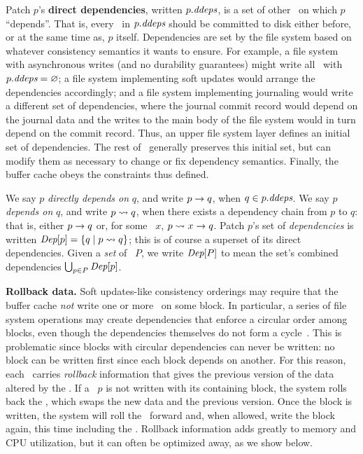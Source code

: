 Patch $p$'s \textbf{direct dependencies}, written $\PDDepset{p}$, is a set of
 other \patches\ on which $p$ ``depends''.
%
That is, every \patch\ in $\PDDepset{p}$ should be committed to disk either
 before, or at the same time as, $p$ itself.
%
Dependencies are set by the file system based on whatever consistency
 semantics it wants to ensure.
%
For example, a file system with asynchronous writes (and no durability
 guarantees) might write all \patches\ with $\PDDepset{p} = \emptyset$;
%
a file system implementing soft updates would arrange the dependencies
 accordingly;
%
and a file system implementing journaling would write a different set of
 dependencies, where the journal commit record would depend on the journal
 data and the writes to the main body of the file system would in turn
 depend on the commit record.
%
Thus, an upper file system layer defines an initial set of
 dependencies.
%
The rest of \Kudos\ generally preserves this initial set, but can modify
 them as necessary to change or fix dependency semantics.
%
Finally, the buffer cache obeys the constraints thus defined.


We say $p$ \emph{directly depends on} $q$, and write $p \rightarrow q$, when
 $q \in \PDDepset{p}$.
%
We say $p$ \emph{depends on} $q$, and write $p \leadsto q$, when there
 exists a dependency chain from $p$ to $q$: that is, either $p \rightarrow q$
 or, for some \patch\ $x$, $p \leadsto x \rightarrow q$.
%
Patch $p$'s set of \emph{dependencies} is written $\textit{Dep}[p] = \{ q \mid
 p \leadsto q \}$; this is of course a superset of its direct dependencies.
%
Given a \emph{set} of \patches\ $P$, we write $\textit{Dep}[P]$ to mean the set's
 combined dependencies $\bigcup_{p\in P} \textit{Dep}[p]$.



\textbf{Rollback data.}
%
Soft updates-like consistency orderings may require that the buffer cache
\emph{not} write one or more \patches\ on some block.
%
In particular, a series of file system operations may create dependencies
that enforce a circular order among blocks, even though the dependencies
themselves do not form a cycle~\cite{ganger00soft}.
%
This is problematic since blocks with circular dependencies can never be
written: no block can be written first since each block depends on another.
%
For this reason, each \patch\ carries \emph{rollback} information that gives
the previous version of the data altered by the \patch.
%
If a \patch\ $p$ is not written with its containing block, the system rolls
back the \patch, which swaps the new data and the previous version.
%
Once the block is written, the system will roll the \patch\ forward and, when
allowed, write the block again, this time including the \patch.
%
Rollback information adds greatly to memory and CPU utilization, but it can
often be optimized away, as we show below.


